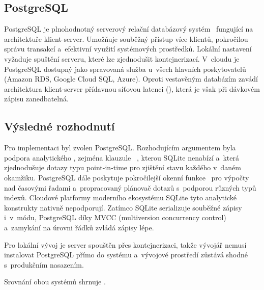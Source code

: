 \subsection{PostgreSQL}
\label{subsec:implementation:db_choice:postgresql}

PostgreSQL je plnohodnotný serverový relační databázový systém~\cite{postgresql_about} fungující na architektuře klient-server. Umožňuje souběžný přístup více klientů, pokročilou správu transakcí a~efektivní využití systémových prostředků. Lokální nastavení vyžaduje spuštění serveru, které lze zjednodušit kontejnerizací. V~cloudu je PostgreSQL dostupný jako spravovaná služba u~všech hlavních poskytovatelů (Amazon RDS, Google Cloud SQL, Azure). Oproti vestavěným databázím zavádí architektura klient-server přídavnou síťovou latenci (\TCPIP), která je však při dávkovém zápisu zanedbatelná.

\subsection{Výsledné rozhodnutí}
\label{subsec:implementation:db_choice:decision}

Pro implementaci byl zvolen PostgreSQL. Rozhodujícím argumentem byla podpora analytického \SQL, zejména klauzule ~\cite{postgresql_distinct_on}, kterou SQLite nenabízí a~která zjednodušuje dotazy typu point-in-time pro zjištění stavu každého \PR v~daném okamžiku. PostgreSQL dále poskytuje pokročilejší okenní funkce~\cite{postgresql_window_functions} pro výpočty nad časovými řadami a~propracovaný plánovač dotazů s~podporou různých typů indexů. Cloudové platformy moderního ekosystému SQLite tyto analytické konstrukty nativně nepodporují. Zatímco SQLite serializuje souběžné zápisy i~v~\WAL módu, PostgreSQL díky MVCC (multiversion concurrency control) a~zamykání na úrovni řádků zvládá zápisy lépe.

Pro lokální vývoj je server spouštěn přes kontejnerizaci, takže vývojář nemusí instalovat PostgreSQL přímo do systému a~vývojové prostředí zůstává shodné s~produkčním nasazením.

Srovnání obou systémů shrnuje .

